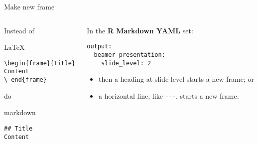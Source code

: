 \documentclass[
  10pt,
  ignorenonframetext,
  aspectratio=169,
]{beamer}
\providecommand{\tightlist}{%
  \setlength{\itemsep}{0pt}\setlength{\parskip}{0pt}}
\begin{document}
\begin{frame}[fragile]{Make new frame}
\protect\hypertarget{make-new-frame}{}

\begin{columns}[T]
\begin{column}{0.48\textwidth}
Instead of

\begin{block}{\LaTeX}

\begin{verbatim}
\begin{frame}{Title}
Content
\ end{frame}
\end{verbatim}

\end{block}

do

\begin{block}{markdown}

\begin{verbatim}
## Title
Content
\end{verbatim}

\end{block}
\end{column}

\begin{column}{0.48\textwidth}
In the \textbf{R Markdown YAML} set:

\begin{verbatim}
output:
  beamer_presentation:
    slide_level: 2
\end{verbatim}

\begin{itemize}
\tightlist
\item
  then a heading at slide level starts a new frame; or
\item
  a horizontal line, like \texttt{-\/-\/-}, starts a new frame.
\end{itemize}
\end{column}
\end{columns}

\end{frame}
\end{document}
